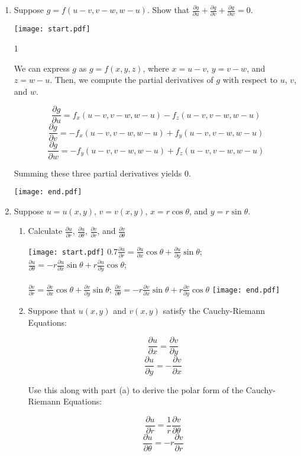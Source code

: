 \documentclass[12pt]{article}
\begin{document}
\begin{enumerate}
\newpage

\item Suppose $g=f(u-v,v-w,w-u)$.  Show that $\frac{\partial g}{\partial u}+\frac{\partial g}{\partial v}+\frac{\partial g}{\partial w}=0$.

\texttt{[image: start.pdf]}
{{{1\linewidth}{We can express $g$ as $g=f(x,y,z)$, where $x=u-v$, $y=v-w$, and $z=w-u$.  Then, we compute the partial derivatives of $g$ with respect to $u$, $v$, and $w$.

$$\frac{\partial g}{\partial u}=f_x(u-v,v-w,w-u)-f_z(u-v,v-w,w-u)$$
$$\frac{\partial g}{\partial v}=-f_x(u-v,v-w,w-u)+f_y(u-v,v-w,w-u)$$
$$\frac{\partial g}{\partial w}=-f_y(u-v,v-w,w-u)+f_z(u-v,v-w,w-u)$$

Summing these three partial derivatives yields 0.}}}
\texttt{[image: end.pdf]}


\item Suppose $u=u(x,y)$, $v=v(x,y)$, $x=r\cos{\theta}$, and $y=r\sin{\theta}$.

\begin{enumerate}

\item Calculate $\frac{\partial u}{\partial r}$, $\frac{\partial u}{\partial \theta}$, $\frac{\partial v}{\partial r}$, and $\frac{\partial v}{\partial \theta}$

\texttt{[image: start.pdf]}
{{{0.7\linewidth}{$\frac{\partial u}{\partial r}=\frac{\partial u}{\partial x}\cos{\theta}+\frac{\partial u}{\partial y}\sin{\theta}$; $\frac{\partial u}{\partial \theta}=-r\frac{\partial u}{\partial x}\sin{\theta}+r\frac{\partial u}{\partial y}\cos{\theta}$;\\
\\
$\frac{\partial v}{\partial r}=\frac{\partial v}{\partial x}\cos{\theta}+\frac{\partial v}{\partial y}\sin{\theta}$; $\frac{\partial v}{\partial \theta}=-r\frac{\partial v}{\partial x}\sin{\theta}+r\frac{\partial v}{\partial y}\cos{\theta}$}}}
\texttt{[image: end.pdf]}


\item Suppose that $u(x,y)$ and $v(x,y)$ satisfy the Cauchy-Riemann Equations:

$$\frac{\partial u}{\partial x}=\frac{\partial v}{\partial y}$$
$$\frac{\partial u}{\partial y}=-\frac{\partial v}{\partial x}$$

Use this along with part (a) to derive the polar form of the Cauchy-Riemann Equations:

$$\frac{\partial u}{\partial r}=\frac{1}{r}\frac{\partial v}{\partial \theta}$$
$$\frac{\partial u}{\partial \theta}=-r\frac{\partial v}{\partial r}$$


\end{enumerate}
\end{enumerate}
\end{document}
